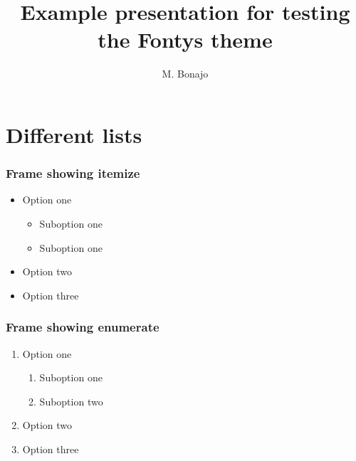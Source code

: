 \documentclass[aspectratio=169]{beamer}
\title{Example presentation for testing the Fontys theme}
\institute{FHTenL}
\author{M. Bonajo}
\begin{document}
\begin{titleframe}
    \titlepage
\end{titleframe}

\begin{frame}
    \tableofcontents
\end{frame}

\section{Different lists}
\begin{frame}
    \frametitle{Frame showing itemize}

    \begin{itemize}
        \item Option one
        \begin{itemize}
            \item Suboption one
            \item Suboption one
        \end{itemize}
        \item Option two
        \item Option three
    \end{itemize}

\end{frame}

\begin{frame}
    \frametitle{Frame showing enumerate}

    \begin{enumerate}
        \item Option one
        \begin{enumerate}
            \item Suboption one
            \item Suboption two
        \end{enumerate}
        \item Option two
        \item Option three
    \end{enumerate}
\end{frame}
\end{document}
